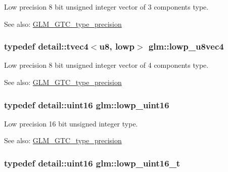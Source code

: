 Low precision 8 bit unsigned integer vector of 3 components type. \begin{Desc}
\item[See also:]\hyperlink{group__gtc__type__precision}{GLM\_\-GTC\_\-type\_\-precision} \end{Desc}
\hypertarget{group__gtc__type__precision_g98f82380862128fac9afae1b53840562}{
\subsubsection[lowp\_\-u8vec4]{\setlength{\rightskip}{0pt plus 5cm}typedef detail::tvec4$<$u8, lowp$>$ {\bf glm::lowp\_\-u8vec4}}}
\label{group__gtc__type__precision_g98f82380862128fac9afae1b53840562}


Low precision 8 bit unsigned integer vector of 4 components type. \begin{Desc}
\item[See also:]\hyperlink{group__gtc__type__precision}{GLM\_\-GTC\_\-type\_\-precision} \end{Desc}
\hypertarget{group__gtc__type__precision_g9b8409887319f62f06e664f6ca121b9d}{
\subsubsection[lowp\_\-uint16]{\setlength{\rightskip}{0pt plus 5cm}typedef detail::uint16 {\bf glm::lowp\_\-uint16}}}
\label{group__gtc__type__precision_g9b8409887319f62f06e664f6ca121b9d}


Low precision 16 bit unsigned integer type. \begin{Desc}
\item[See also:]\hyperlink{group__gtc__type__precision}{GLM\_\-GTC\_\-type\_\-precision} \end{Desc}
\hypertarget{group__gtc__type__precision_g9a71176a4e5bc61951f9e9197d9c80e1}{
\subsubsection[lowp\_\-uint16\_\-t]{\setlength{\rightskip}{0pt plus 5cm}typedef detail::uint16 {\bf glm::lowp\_\-uint16\_\-t}}}
\label{group__gtc__type__precision_g9a71176a4e5bc61951f9e9197d9c80e1}


